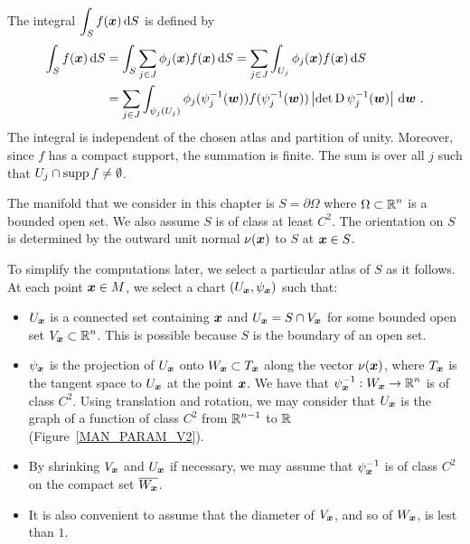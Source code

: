 The integral $\displaystyle \int_S f({\bm{x}}) \,\mathrm{d}{S}$ is defined by
\begin{align*}
\int_S f({\bm{x}}) \,\mathrm{d}{S} &= \int_S
\sum_{j\in J} \phi_j({\bm{x}}) f({\bm{x}}) \,\mathrm{d}{S} =
\sum_{j\in J} \int_{U_j} \phi_j({\bm{x}}) f({\bm{x}}) \,\mathrm{d}{S} \\
&= \sum_{j\in J} \int_{\psi_j(U_j)} \phi_j(\psi_j^{-1}({\bm{w}}))
f(\psi_j^{-1}({\bm{w}}))
\left|\det \operatorname{D} \psi_j^{-1} ({\bm{w}}) \right| \,\mathrm{d}{{\bm{w}}} \ .
\end{align*}
The integral is independent of the chosen atlas and partition of
unity.  Moreover, since $f$ has a compact support, the summation is
finite.  The sum is over all $j$ such that
$U_j \cap \operatorname{supp} f \neq \emptyset$.

The manifold that we consider in this chapter is $S = \partial \Omega$
where $\displaystyle \Omega \subset \mathbb{R}^n$ is a bounded open set.  We also
assume $S$ is of class at least $\displaystyle C^2$.  The orientation on $S$ is
determined by the outward unit normal $\nu({\bm{x}})$ to $S$ at
${\bm{x}} \in S$.

To simplify the computations later, we select a particular atlas of
$S$ as it follows.  At each point ${\bm{x}} \in M$, we select a
chart $\displaystyle \left(U_{{\bm{x}}},\psi_{{\bm{x}}}\right)$ such
that:
\begin{itemize}
\item $\displaystyle U_{{\bm{x}}}$ is a connected set containing
${\bm{x}}$ and $\displaystyle U_{{\bm{x}}} = S \cap V_{{\bm{x}}}$ for
some bounded open set $\displaystyle V_{{\bm{x}}} \subset \mathbb{R}^n$.  This is
possible because $S$ is the boundary of an open set.
\item $\displaystyle \psi_{{\bm{x}}}$ is the projection of
$\displaystyle U_{{\bm{x}}}$ onto
$\displaystyle W_{{\bm{x}}} \subset T_{{\bm{x}}}$ along the vector
$\nu({\bm{x}})$, where $\displaystyle T_{{\bm{x}}}$ is the
tangent space to $\displaystyle U_{{\bm{x}}}$ at the point
${\bm{x}}$.  We have that
$\displaystyle \psi_{{\bm{x}}}^{-1}: W_{{\bm{x}}} \to \mathbb{R}^n$ is of
class $\displaystyle C^2$.  Using translation and rotation, we may consider
that $\displaystyle U_{{\bm{x}}}$ is the graph
of a function of class $\displaystyle C^2$ from $\displaystyle \mathbb{R}^{n-1}$
to $\mathbb{R}$
(Figure~\ref{MAN_PARAM_V2}).
\item By shrinking $\displaystyle V_{{\bm{x}}}$ and $\displaystyle U_{{\bm{x}}}$
if necessary, we may assume that $\displaystyle \psi_{{\bm{x}}}^{-1}$ is of class
$\displaystyle C^2$ on the compact set $\displaystyle \overline{W_{{\bm{x}}}}$.
\item It is also convenient to assume that the diameter of
$V_{{\bm{x}}}$, and so of $W_{{\bm{x}}}$, is lest than $1$.
\end{itemize}

